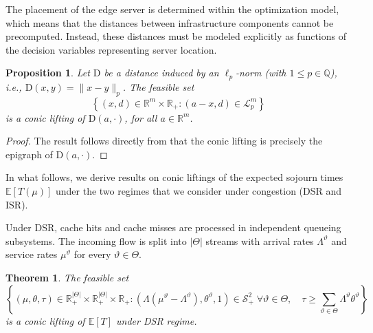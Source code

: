 \documentclass[a4paper,11pt,reqno]{amsart}
\newtheorem{theorem}{Theorem}
\newtheorem{proposition}{Proposition}
\newcommand{\R}{\mathbb{R}}
\newcommand{\E}{\mathbb{E}}
\newcommand{\LL}{\mathcal{L}}
\renewcommand{\SS}{\mathcal{S}}
\newcommand{\D}{\mathrm{D}}
\begin{document}
 The placement of the edge server is determined within the optimization model, which means that the distances between infrastructure components cannot be precomputed. Instead, these distances must be modeled explicitly as functions of the decision variables representing server location.

\begin{proposition}\label{prop:distance}
    Let $\D$ be a distance induced by an $\ell_p$-norm (with $1\leq p \in \mathbb{Q}$), i.e., $\D(x,y)=\|x-y\|_p$. The feasible set 
    \begin{equation*}
    \left\{(x,d)\in \R^m\times\R_+ : (a-x,d)\in \LL^m_p \right\}
    \end{equation*}
    is a conic lifting of $\D(a,\cdot)$, for all $a\in \R^m$.
\end{proposition}

\begin{proof}
    The result follows directly from that the conic lifting is precisely the epigraph of $\D(a,\cdot)$.
\end{proof}

 In what follows, we derive results on conic liftings of the expected sojourn times $\E[T(\mu)]$ under the two regimes  that we consider under congestion (DSR and ISR).

Under DSR, cache hits and cache misses are processed in independent queueing subsystems. The incoming flow is split into $|\Theta|$ streams with arrival rates $\Lambda^\vartheta$ and service rates $\mu^\vartheta$ for every $\vartheta\in\Theta$. 



\begin{theorem}\label{th:expectation_dsr}
    The feasible set 
    \begin{equation*}
    \left\{(\mu,\theta,\tau)\in \R^{|\Theta|}_+\times\R^{|\Theta|}_+\times \R_+ :  (\Lambda(\mu^\vartheta-\Lambda^\vartheta), \theta^\vartheta,1)\in \SS^2_+\;  \forall \vartheta\in\Theta, \quad \tau\geq \sum_{\vartheta\in\Theta} \Lambda^\vartheta\theta^\vartheta\right\}
    \end{equation*}
    is a conic lifting of $\E[T]$ under {\rm DSR} regime.
\end{theorem}
\end{document}
